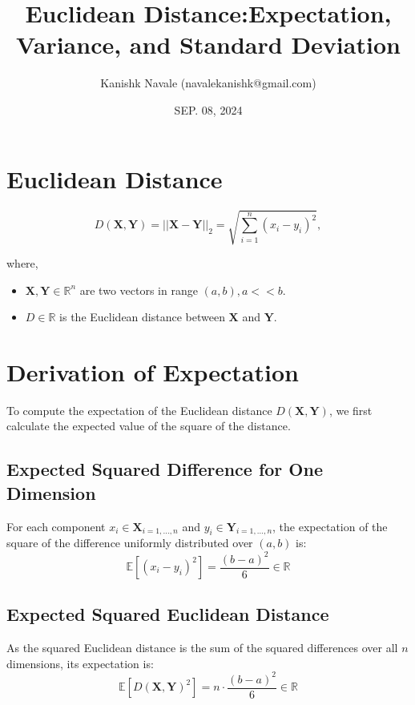 \documentclass{article}
\title{Euclidean Distance:\linebreak Expectation, Variance, and Standard Deviation}
\author{Kanishk Navale (navalekanishk@gmail.com)}
\date{SEP. 08, 2024}
\begin{document}
\maketitle

\section{Euclidean Distance}
\begin{equation}
    D(\mathbf{X}, \mathbf{Y}) = \vert\vert \mathbf{X} - \mathbf{Y} \vert\vert_2 = \sqrt{\sum_{i=1}^{n} (x_i - y_i)^2},
\end{equation}

where,
\begin{itemize}
    \item $\mathbf{X}, \mathbf{Y} \in \mathbb{R}^n$ are two vectors in range $(a, b), a << b$.
    \item $D \in \mathbb{R}$ is the Euclidean distance between $\mathbf{X}$ and $\mathbf{Y}$.
\end{itemize}

\section{Derivation of Expectation}
To compute the expectation of the Euclidean distance $D(\mathbf{X}, \mathbf{Y})$, we first calculate the expected value of the square of the distance.

\subsection{Expected Squared Difference for One Dimension}
For each component $x_i \in \mathbf{X}_{i=1, \dots, n}$ and $y_i \in \mathbf{Y}_{i=1, \dots, n}$, the expectation of the square of the difference uniformly distributed over $(a, b)$ is:
\begin{equation}
    \mathbb{E}[(x_i - y_i)^2] = \frac{(b - a)^2}{6} \in \mathbb{R}
\end{equation}


\subsection{Expected Squared Euclidean Distance}
As the squared Euclidean distance is the sum of the squared differences over all $n$ dimensions, its expectation is:
\begin{equation}
    \mathbb{E}[D(\mathbf{X}, \mathbf{Y})^2] = n \cdot \frac{(b - a)^2}{6} \in \mathbb{R}
\end{equation}
\end{document}
